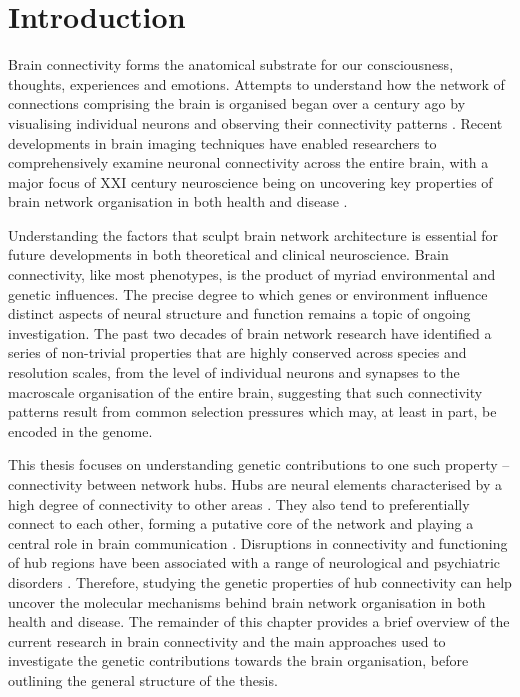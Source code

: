 \chapter{Introduction}
\label{ch:Introduction}

Brain connectivity forms the anatomical substrate for our consciousness, thoughts, experiences and emotions. Attempts to understand how the network of connections comprising the brain is organised began over a century ago by visualising individual neurons and observing their connectivity patterns \citep{RamonyCajal1995}. Recent developments in brain imaging techniques have enabled researchers to comprehensively examine neuronal connectivity across the entire brain, with a major focus of XXI century neuroscience being on uncovering key properties of brain network organisation in both health and disease \mbox{\citep{VandenHeuvel2010b,Bullmore2012,Fornito2015}}.

Understanding the factors that sculpt brain network architecture is essential for future developments in both theoretical and clinical neuroscience. Brain connectivity, like most phenotypes, is the product of myriad environmental and genetic influences. The precise degree to which genes or environment influence distinct aspects of neural structure and function remains a topic of ongoing investigation. The past two decades of brain network research have identified a series of non-trivial properties that are highly conserved across species and resolution scales, from the level of individual neurons and synapses to the macroscale organisation of the entire brain, suggesting that such connectivity patterns result from common selection pressures which may, at least in part, be encoded in the genome.

This thesis focuses on understanding genetic contributions to one such property -- connectivity between network hubs. Hubs are neural elements  characterised by a high degree of connectivity to other areas \citep{VandenHeuvel2013b}. They also tend to preferentially connect to each other, forming a putative core of the network and playing a central role in brain communication \citep{VandenHeuvel2011,VandenHeuvel2013a}. Disruptions in connectivity and functioning of hub regions have been associated with a range of neurological and psychiatric disorders \mbox{\citep{Crossley2014,VandenHeuvel2013b,Fornito2015}}. Therefore, studying the genetic properties of hub connectivity can help uncover the molecular mechanisms behind brain network organisation in both health and disease. The remainder of this chapter provides a brief overview of the current research in brain connectivity and the main approaches used to investigate the genetic contributions towards the brain organisation, before outlining the general structure of the thesis.


